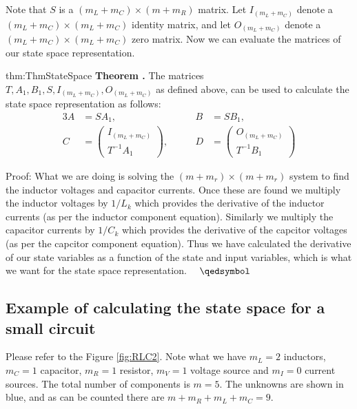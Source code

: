 \documentclass[14pt,a5paper,twoside]{book}
\newenvironment{myTheorem}[2]{ \begin{Theorem}[adjusted title=#1]{}{#2} 
  \textbf{Theorem \thetcbcounter.} \label{#2}}{\end{Theorem}}
\begin{document}
Note that $S$ is a $(m_L+m_C)\times(m+m_R)$ matrix. Let $I_{(m_L+m_C)}$ denote a $(m_L+m_C)\times(m_L+m_C)$ identity matrix, and let $O_{(m_L+m_C)}$ denote a $(m_L+m_C)\times(m_L+m_C)$ zero matrix. Now we can evaluate the matrices of our state space representation.

\begin{myTheorem}{State Space for Electric Circuits}{thm:ThmStateSpace}
	The matrices $T, A_1, B_1, S, I_{(m_L+m_C)}, O_{(m_L+m_C)}$ as defined above, can be used to calculate the state space representation as follows:
\begin{alignat*}{3}
A &= S A_1, \quad\quad &B &= SB_1, \\
C &= \begin{pmatrix} I_{(m_L+m_C)} \\ T^{-1}A_1 \end{pmatrix}, \quad\quad &D &= \begin{pmatrix} O_{(m_L+m_C)} \\ T^{-1}B_1 \end{pmatrix}
\end{alignat*}
\end{myTheorem}
Proof: What we are doing is solving the $(m+m_r)\times(m+m_r)$ system to find the inductor voltages and capacitor currents. Once these are found we multiply the inductor voltages by $1/L_k$ which provides the derivative of the inductor currents (as per the inductor component equation). Similarly we multiply the capacitor currents by $1/C_k$ which provides the derivative of the capcitor voltages (as per the capcitor component equation). Thus we have calculated the derivative of our state variables as a function of the state and input variables, which is what we want for the state space representation. $\quad\qedsymbol$

\newpage
\subsection{Example of calculating the state space for a small circuit}

Please refer to the Figure \ref{fig:RLC2}. Note what we have $m_L = 2$ inductors, $m_C = 1$ capacitor, $m_R=1$ resistor, $m_V=1$ voltage source and $m_I=0$ current sources. The total number of components is $m=5$. The unknowns are shown in blue, and as can be counted there are $m+m_R+m_L+m_C = 9$.
\end{document}

